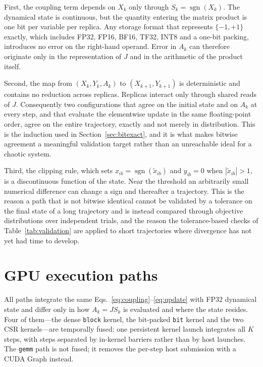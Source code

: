 \documentclass[11pt,a4paper]{article}
\newcommand{\code}[1]{\texttt{#1}}
\begin{document}
First, the coupling term depends on $X_k$ only through $S_k=\operatorname{sgn}(X_k)$. The dynamical state is continuous, but the quantity entering the matrix product is one bit per variable per replica. Any storage format that represents $\{-1,+1\}$ exactly, which includes FP32, FP16, BF16, TF32, INT8 and a one-bit packing, introduces no error on the right-hand operand. Error in $A_k$ can therefore originate only in the representation of $J$ and in the arithmetic of the product itself.

Second, the map from $(X_k,Y_k,A_k)$ to $(X_{k+1},Y_{k+1})$ is deterministic and contains no reduction across replicas. Replicas interact only through shared reads of $J$. Consequently two configurations that agree on the initial state and on $A_k$ at every step, and that evaluate the elementwise update in the same floating-point order, agree on the entire trajectory, exactly and not merely in distribution. This is the induction used in Section~\ref{sec:bitexact}, and it is what makes bitwise agreement a meaningful validation target rather than an unreachable ideal for a chaotic system.

Third, the clipping rule, which sets $x_{ib}=\operatorname{sgn}(\tilde x_{ib})$ and $y_{ib}=0$ when $|\tilde x_{ib}|>1$, is a discontinuous function of the state. Near the threshold an arbitrarily small numerical difference can change a sign and thereafter a trajectory. This is the reason a path that is not bitwise identical cannot be validated by a tolerance on the final state of a long trajectory and is instead compared through objective distributions over independent trials, and the reason the tolerance-based checks of Table~\ref{tab:validation} are applied to short trajectories where divergence has not yet had time to develop.

\section{GPU execution paths}\label{sec:paths}
All paths integrate the same Eqs.~\eqref{eq:coupling}--\eqref{eq:update} with FP32 dynamical state and differ only in how $A_k=JS_k$ is evaluated and where the state resides. Four of them---the dense \code{block} kernel, the bit-packed \code{bit} kernel and the two CSR kernels---are temporally fused: one persistent kernel launch integrates all $K$ steps, with steps separated by in-kernel barriers rather than by host launches. The \code{gemm} path is not fused; it removes the per-step host submission with a CUDA Graph instead.
\end{document}
